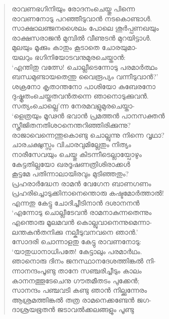 \begin{verse}
രാവണഭഗിനിയും രോദനംചെയ്തു പിന്നെ\\
രാവണനോടു പറഞ്ഞീടുവാന്‍ നടകൊണ്ടാള്‍.\\
സാക്ഷാലഞ്ജനശൈലം പോലെ ശൂര്‍പ്പണഖയും\\
രാക്ഷസരാജന്‍ മുമ്പില്‍ വീണുടന്‍ മുറയിട്ടാള്‍.\\
മുലയും മൂക്കും കാതും കൂടാതെ ചോരയുമാ-\\
യലറും ഭഗിനിയോടവനുമുരചെയ്താന്‍:\\
‘എന്തിതു വത്സേ! ചൊല്ലീടെന്നോടു പരമാര്‍ത്ഥം\\
ബന്ധമുണ്ടായതെന്തു വൈരൂപ്യം വന്നീടുവാന്‍?’\\
ശക്രനോ കൃതാന്തനോ പാശിയോ കുബേരനോ\\
ദുഷ്കൃതംചെയ്തതവന്‍തന്നെ ഞാനൊടുക്കുവന്‍.\\
സത്യംചൊല്ലെ’ന്ന നേരമവളുമുരചെയ്താ-\\
‘ളെത്രയും മൂഢന്‍ ഭവാന്‍ പ്രമത്തന്‍ പാനസക്തന്‍\\
സ്ത്രീജിതനതിശഠനെന്തറിഞ്ഞിരിക്കുന്നു?\\
രാജാവെന്നെന്തുകൊണ്ടു ചൊല്ലുന്നു നിന്നെ വൃഥാ?\\
ചാരചക്ഷുസ്സം വിചാരവുമില്ലേതും നിത്യം\\
നാരീസേവയും ചെയ്തു കിടന്നീടെല്ലായ്പോഴും\\
കേട്ടതില്ലയോ ഖരദൂഷണത്രിശിരാക്കള്‍\\
കൂട്ടമേ പതിന്നാലായിരവും മുടിഞ്ഞതും?\\
പ്രഹരാര്‍ദ്ധേന രാമന്‍ വേഗേന ബാണഗണം\\
പ്രഹരിച്ചൊടുക്കിനാനെന്തൊരു കഷ്ടമോര്‍ത്താല്‍!\\
എന്നതു കേട്ടു ചോദിച്ചീടിനാന്‍ ദശാനനന്‍\\
‘എന്നോടു ചൊല്ലീടേവന്‍ രാമനാകുന്നതെന്നും\\
എന്തൊരു മൂലമവന്‍ കൊല്ലുവാനെന്നുമെന്നാ-\\
ലന്തകന്‍തനിക്കു നല്കീടുവനവനെ ഞാന്‍.’\\
സോദരി ചൊന്നാളതു കേട്ടു രാവണനോടു:\\
‘യാതുധാനാധിപതേ! കേട്ടാലും പരമാര്‍ഥം.\\
ഞാനൊരു ദിനം ജനസ്ഥാനദേശത്തിങ്കല്‍ നി-\\
ന്നാനന്ദംപൂണ്ടു താനേ സഞ്ചരിച്ചീടും കാലം\\
കാനനത്തൂടേചെനു ഗൗതമീതടം പുക്കേന്‍;\\
സാനന്ദം പഞ്ചവടി കണ്ടു ഞാന്‍ നില്ക്കുന്നേരം\\
ആശ്രമത്തിങ്കല്‍ തത്ര രാമനെക്കണ്ടേന്‍ ജഗ-\\
ദാശ്രയഭൂതന്‍ ജടാവല്‍ക്കലങ്ങളും പൂണ്ടു\\

\end{verse}
